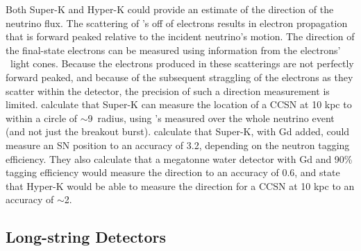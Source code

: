 Both Super-K and Hyper-K could provide an estimate of the direction of the neutrino 
flux.  The scattering of \nue's  off of electrons results in electron 
propagation that is forward peaked relative 
to the incident neutrino's motion.  The direction of
the final-state electrons can be measured using information from the
electrons' \cer\ light cones.  Because the electrons produced in these
scatterings are not perfectly forward peaked, and because of the
subsequent straggling of the electrons as they scatter within the
detector, the precision of such a direction measurement is
limited.  \cite{andosato2002} calculate that Super-K can measure the
location of a CCSN at 10 kpc to within a circle of
$\sim$9\degree\ radius, using \nue's measured over the whole neutrino
event (and not just the breakout burst).  \cite{tomasetal2003}
calculate that Super-K, with Gd added, could measure an SN
position to an accuracy of 3.2\degree,
depending on the neutron tagging efficiency.  They also calculate that
a megatonne water detector with Gd and 90\% tagging efficiency would measure
the direction to an accuracy of 0.6\degree, and  \cite{abeetal2011} state
that Hyper-K would be able to measure the direction for a CCSN at 10 kpc
to an accuracy of $\sim$2\degree.

\subsection{Long-string Detectors}

